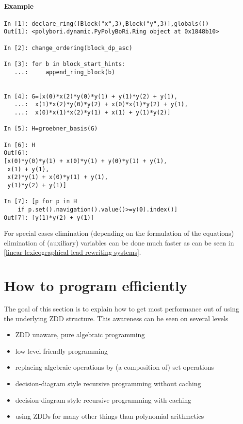 \paragraph{Example} %
\label{par:example-elimination}
\begin{lstlisting}
In [1]: declare_ring([Block("x",3),Block("y",3)],globals())
Out[1]: <polybori.dynamic.PyPolyBoRi.Ring object at 0x1848b10>

In [2]: change_ordering(block_dp_asc)

In [3]: for b in block_start_hints:
   ...:     append_ring_block(b)
     

In [4]: G=[x(0)*x(2)*y(0)*y(1) + y(1)*y(2) + y(1),
   ...:  x(1)*x(2)*y(0)*y(2) + x(0)*x(1)*y(2) + y(1),
   ...:  x(0)*x(1)*x(2)*y(1) + x(1) + y(1)*y(2)]

In [5]: H=groebner_basis(G)

In [6]: H
Out[6]: 
[x(0)*y(0)*y(1) + x(0)*y(1) + y(0)*y(1) + y(1),
 x(1) + y(1),
 x(2)*y(1) + x(0)*y(1) + y(1),
 y(1)*y(2) + y(1)]

In [7]: [p for p in H 
    if p.set().navigation().value()>=y(0).index()]
Out[7]: [y(1)*y(2) + y(1)]
\end{lstlisting}

For special cases elimination (depending on the formulation of the equations) elimination of (auxiliary) variables can be done much faster as can be seen in \ref{linear-lexicographical-lead-rewriting-systems}.



\section{How to program efficiently}
\label{sec:program-efficiently}
The goal of this section is to explain how to get most performance out of \PolyBoRi using the underlying ZDD structure.
This awareness can be seen on several levels
\begin{itemize}
    \item ZDD unaware, pure algebraic programming 
    \item low level friendly programming
    \item replacing algebraic operations by (a composition of) set operations
    \item decision-diagram style recursive programming without caching
    \item decision-diagram style recursive programming with caching
    \item using ZDDs for many other things than polynomial arithmetics
\end{itemize}
